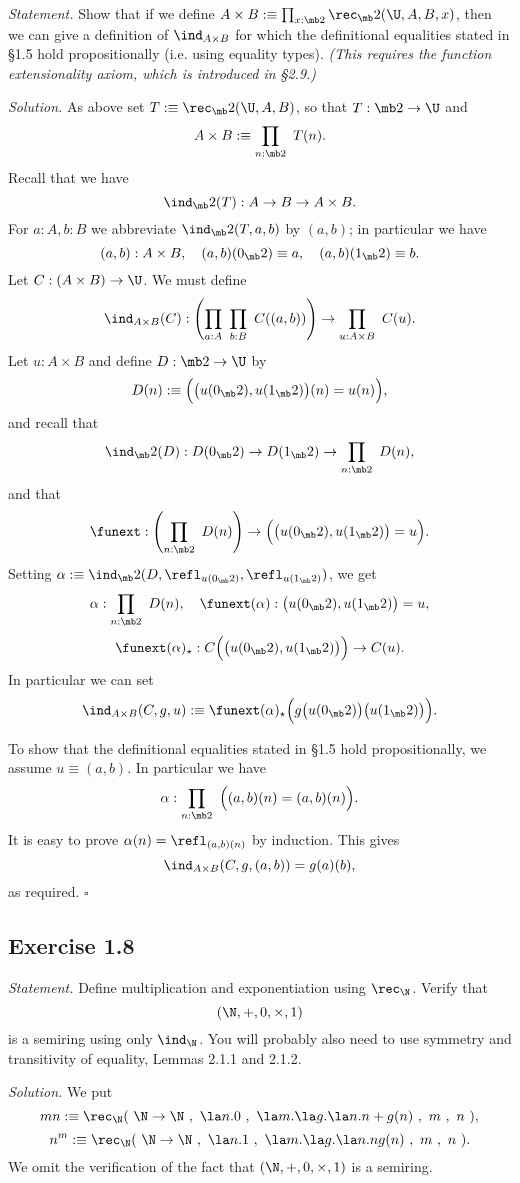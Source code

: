 \documentclass[12pt]{article}
\begin{document}
\emph{Statement.} Show that if we define $A\times B:\equiv\prod_{x:\mb2}\rec_\mb2(\U,A,B,x)$, then we can give a definition of  $\ind_{A\times B}$ for which the definitional equalities stated in \S1.5 hold propositionally (i.e. using equality types). \emph{(This requires the function extensionality axiom, which is introduced in \S2.9.)}

\nn\emph{Solution.} As above set $T:\equiv\rec_\mb2(\U,A,B)$, so that $T:\mb2\to\U$ and 
$$
A\times B:\equiv\prod_{n:\mb2}\ T(n).
$$ 
Recall that we have
$$
\ind_\mb2(T):A\to B\to A\times B.
$$ 
For $a:A,b:B$ we abbreviate $\ind_\mb2(T,a,b)$ by $(a,b)$; in particular we have 
$$
(a,b):A\times B,\quad(a,b)(0_\mb2)\equiv a,\quad(a,b)(1_\mb2)\equiv b.
$$ 
Let $C:(A\times B)\to\U$. We must define 
$$
\ind_{A\times B}(C):\left(\prod_{a:A}\ \prod_{b:B}\ C((a,b))\right)\to\prod_{u:A\times B}\ C(u).
$$ 
Let $u:A\times B$ and define $D:\mb2\to\U$ by 
$$
D(n):\equiv\Big(\big(u(0_\mb2),u(1_\mb2)\big)(n)=u(n)\Big),
$$ 
and recall that 
$$
\ind_\mb2(D):D(0_\mb2)\to D(1_\mb2)\to\prod_{n:\mb2}\ D(n),
$$ 
and that 
$$
\funext:\left(\prod_{n:\mb2}\ D(n)\right)\to\Big(\big(u(0_\mb2),u(1_\mb2)\big)=u\Big).
$$ 
Setting $\alpha:\equiv\ind_\mb2(D,\refl_{u(0_\mb2)},\refl_{u(1_\mb2)})$, we get 
$$
\alpha:\prod_{n:\mb2}\ D(n),\quad\funext(\alpha):\big(u(0_\mb2),u(1_\mb2)\big)=u,
$$
$$
\funext(\alpha)_\star:C\Big(\big(u(0_\mb2),u(1_\mb2)\big)\Big)\to C(u).
$$
In particular we can set
$$
\ind_{A\times B}(C,g,u):\equiv\funext(\alpha)_\star\Big(g\big(u(0_\mb2)\big)\big(u(1_\mb2)\big)\Big).
$$

To show that the definitional equalities stated in \S1.5 hold propositionally, we assume $u\equiv(a,b)$. In particular we have 
$$
\alpha:\prod_{n:\mb2}\ \Big((a,b)(n)=(a,b)(n)\Big).
$$ 
It is easy to prove $\alpha(n)=\refl_{(a,b)(n)}$ by induction. This gives 
$$
\ind_{A\times B}(C,g,(a,b))=g(a)(b),
$$ 
as required. $\square$


\subsection{Exercise 1.8}

\emph{Statement.} Define multiplication and exponentiation using $\rec_\N$. Verify that $$(\N,+,0,\times,1)$$ is a semiring using only $\ind_\N$. You will probably also need to use symmetry and transitivity of equality, Lemmas 2.1.1 and 2.1.2.

\nn\emph{Solution.} We put 
$$
mn:\equiv\rec_\N(\ \N\to\N\ ,\ \la n.0\ ,\ \la m.\la g.\la n.n+g(n)\ ,\ m\ ,\ n\ ),
$$
$$
n^m:\equiv\rec_\N(\ \N\to\N\ ,\ \la n.1\ ,\ \la m.\la g.\la n.ng(n)\ ,\ m\ ,\ n\ ).
$$ 
We omit the verification of the fact that $(\N,+,0,\times,1)$ is a semiring.
\end{document}
